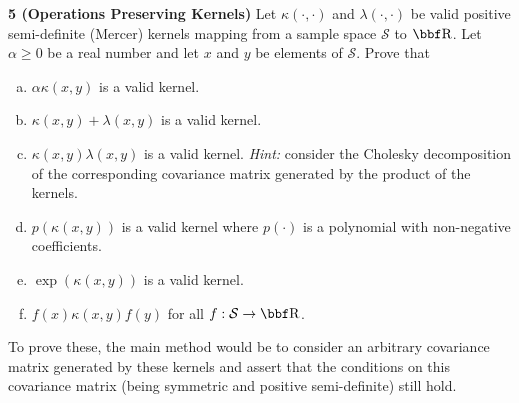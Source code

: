 \documentclass[12pt,letterpaper,fleqn]{hmcpset}
\begin{document}
\textbf{5 (Operations Preserving Kernels)} Let $\kappa(\cdot,\cdot)$ and $\lambda(\cdot,\cdot)$ be valid positive
semi-definite (Mercer) kernels mapping from a sample space $\mathcal{S}$ to $\RR$. Let $\alpha \geq 0$ be a real number
and let $x$ and $y$ be elements of $\mathcal{S}$. Prove that
\begin{enumerate}[(a)]
    \item $\alpha\kappa(x,y)$ is a valid kernel.
    \item $\kappa(x,y) + \lambda(x,y)$ is a valid kernel.
    \item $\kappa(x,y)\lambda(x,y)$ is a valid kernel. \textit{Hint:} consider the Cholesky decomposition
        of the corresponding covariance matrix generated by the product of the kernels.
    \item $p(\kappa(x,y))$ is a valid kernel where $p(\cdot)$ is a polynomial
        with non-negative coefficients.
    \item $\exp(\kappa(x,y))$ is a valid kernel.
    \item $f(x)\kappa(x,y)f(y)$ for all $f : \mathcal{S}\to\RR$.
\end{enumerate}
To prove these, the main method would be to consider an arbitrary covariance matrix
generated by these kernels and assert that the conditions on this covariance matrix (being
symmetric and positive semi-definite) still hold.

\vspace{10mm}
\end{document}
